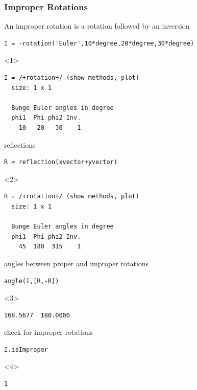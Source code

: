 \documentclass[compress]{beamer}
\begin{document}
\begin{frame}[fragile]
  \frametitle{Improper Rotations}

  \begin{overlayarea}{\textwidth}{7cm}

    An improper rotation is a rotation followed by an inversion
    \begin{lstlisting}[style=input]
I = -rotation('Euler',10*degree,20*degree,30*degree)
    \end{lstlisting}
    \begin{onlyenv}<1>
      \vspace{-0.3cm}
      \begin{lstlisting}[style=output]
I = /+rotation+/ (show methods, plot)
  size: 1 x 1

  Bunge Euler angles in degree
  phi1  Phi phi2 Inv.
    10   20   30    1
  \end{lstlisting}
  \end{onlyenv}

  \pause
  \bigskip

  reflections
  \begin{lstlisting}[style=input]
R = reflection(xvector+yvector)
  \end{lstlisting}
  \begin{onlyenv}<2>
    \vspace{-0.3cm}
  \begin{lstlisting}[style=output]
R = /+rotation+/ (show methods, plot)
  size: 1 x 1

  Bunge Euler angles in degree
  phi1  Phi phi2 Inv.
    45  180  315    1
  \end{lstlisting}
  \end{onlyenv}

  \pause
  \bigskip

  angles between proper and improper rotations
  \begin{lstlisting}[style=input]
angle(I,[R,-R])
  \end{lstlisting}
  \begin{onlyenv}<3>
    \vspace{-0.3cm}
    \begin{lstlisting}[style=output]
  168.5677  180.0000
  \end{lstlisting}
  \end{onlyenv}

  \pause
  \bigskip

  check for improper rotations
\begin{lstlisting}[style=input]
I.isImproper
  \end{lstlisting}
  \begin{onlyenv}<4>
    \vspace{-0.3cm}
    \begin{lstlisting}[style=output]
  1
  \end{lstlisting}
  \end{onlyenv}

\end{overlayarea}
\end{frame}
\end{document}
